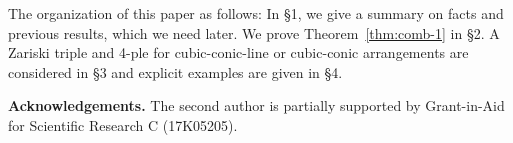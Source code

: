 \documentclass{article}
\begin{document}
The organization of this paper as follows:
In \S 1, we give a summary on  facts and previous results, which we need later.  
We prove Theorem~\ref{thm:comb-1} in \S 2. A Zariski triple and 4-ple for
cubic-conic-line or cubic-conic arrangements are considered in \S 3 and explicit examples are given in \S 4.

\medskip



{\bf Acknowledgements.} The second author is partially supported by Grant-in-Aid for Scientific Research C (17K05205).




%











%
\end{document}

